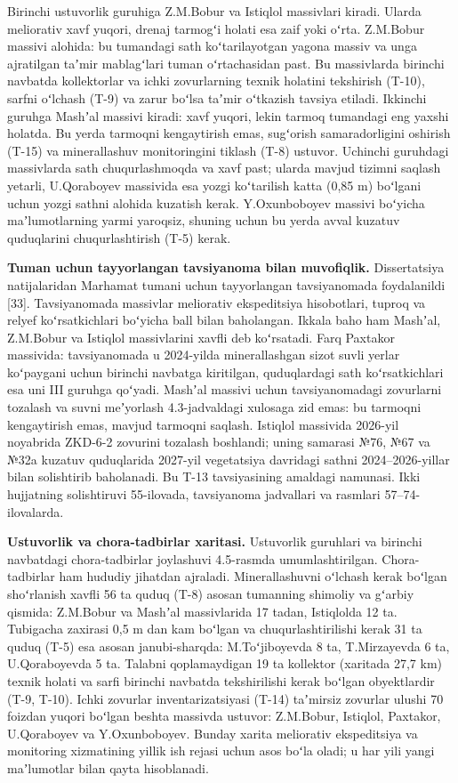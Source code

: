 Birinchi ustuvorlik guruhiga Z.M.Bobur va Istiqlol massivlari kiradi.
Ularda meliorativ xavf yuqori, drenaj tarmogʻi holati esa zaif yoki
oʻrta. Z.M.Bobur massivi alohida: bu tumandagi sath koʻtarilayotgan
yagona massiv va unga ajratilgan taʼmir mablagʻlari tuman oʻrtachasidan
past. Bu massivlarda birinchi navbatda kollektorlar va ichki
zovurlarning texnik holatini tekshirish (T-10), sarfni oʻlchash (T-9) va
zarur boʻlsa taʼmir oʻtkazish tavsiya etiladi. Ikkinchi guruhga Mashʼal
massivi kiradi: xavf yuqori, lekin tarmoq tumandagi eng yaxshi holatda.
Bu yerda tarmoqni kengaytirish emas, sugʻorish samaradorligini oshirish
(T-15) va minerallashuv monitoringini tiklash (T-8) ustuvor. Uchinchi
guruhdagi massivlarda sath chuqurlashmoqda va xavf past; ularda mavjud
tizimni saqlash yetarli, U.Qoraboyev massivida esa yozgi koʻtarilish
katta (0,85 m) boʻlgani uchun yozgi sathni alohida kuzatish kerak.
Y.Oxunboboyev massivi boʻyicha maʼlumotlarning yarmi yaroqsiz, shuning
uchun bu yerda avval kuzatuv quduqlarini chuqurlashtirish (T-5) kerak.

\textbf{Tuman uchun tayyorlangan tavsiyanoma bilan muvofiqlik.}
Dissertatsiya natijalaridan Marhamat tumani uchun tayyorlangan
tavsiyanomada foydalanildi {[}33{]}. Tavsiyanomada massivlar meliorativ
ekspeditsiya hisobotlari, tuproq va relyef koʻrsatkichlari boʻyicha ball
bilan baholangan. Ikkala baho ham Mashʼal, Z.M.Bobur va Istiqlol
massivlarini xavfli deb koʻrsatadi. Farq Paxtakor massivida:
tavsiyanomada u 2024-yilda minerallashgan sizot suvli yerlar koʻpaygani
uchun birinchi navbatga kiritilgan, quduqlardagi sath koʻrsatkichlari
esa uni III guruhga qoʻyadi. Mashʼal massivi uchun tavsiyanomadagi
zovurlarni tozalash va suvni meʼyorlash 4.3-jadvaldagi xulosaga zid
emas: bu tarmoqni kengaytirish emas, mavjud tarmoqni saqlash. Istiqlol
massivida 2026-yil noyabrida ZKD-6-2 zovurini tozalash boshlandi; uning
samarasi №76, №67 va №32a kuzatuv quduqlarida 2027-yil vegetatsiya
davridagi sathni 2024--2026-yillar bilan solishtirib baholanadi. Bu T-13
tavsiyasining amaldagi namunasi. Ikki hujjatning solishtiruvi
55-ilovada, tavsiyanoma jadvallari va rasmlari 57--74-ilovalarda.

\textbf{Ustuvorlik va chora-tadbirlar xaritasi.} Ustuvorlik guruhlari va
birinchi navbatdagi chora-tadbirlar joylashuvi 4.5-rasmda
umumlashtirilgan. Chora-tadbirlar ham hududiy jihatdan ajraladi.
Minerallashuvni oʻlchash kerak boʻlgan shoʻrlanish xavfli 56 ta quduq
(T-8) asosan tumanning shimoliy va gʻarbiy qismida: Z.M.Bobur va Mashʼal
massivlarida 17 tadan, Istiqlolda 12 ta. Tubigacha zaxirasi 0,5 m dan
kam boʻlgan va chuqurlashtirilishi kerak 31 ta quduq (T-5) esa asosan
janubi-sharqda: M.Toʻjiboyevda 8 ta, T.Mirzayevda 6 ta, U.Qoraboyevda 5
ta. Talabni qoplamaydigan 19 ta kollektor (xaritada 27,7 km) texnik
holati va sarfi birinchi navbatda tekshirilishi kerak boʻlgan
obyektlardir (T-9, T-10). Ichki zovurlar inventarizatsiyasi (T-14)
taʼmirsiz zovurlar ulushi 70 foizdan yuqori boʻlgan beshta massivda
ustuvor: Z.M.Bobur, Istiqlol, Paxtakor, U.Qoraboyev va Y.Oxunboboyev.
Bunday xarita meliorativ ekspeditsiya va monitoring xizmatining yillik
ish rejasi uchun asos boʻla oladi; u har yili yangi maʼlumotlar bilan
qayta hisoblanadi.

